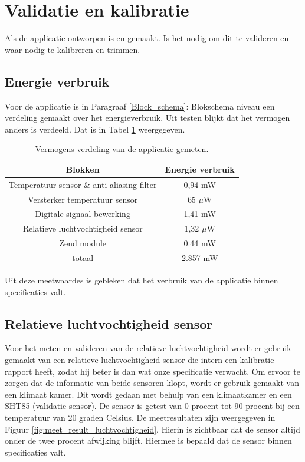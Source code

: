 \section{Validatie en kalibratie}
Als de applicatie ontworpen is en gemaakt. Is het nodig om dit te valideren en waar nodig te kalibreren en trimmen.
\subsection{Energie verbruik}
Voor de applicatie is in Paragraaf \ref{Block_schema}: Blokschema niveau een verdeling gemaakt over het energieverbruik. Uit testen blijkt dat het vermogen anders is verdeeld. Dat is in Tabel \ref{tab:Energie_verbruik_validatie} weergegeven.

\begin{table}[H]
    \centering
    \begin{tabular}{|c|c|}
        \hline
        \textbf{Blokken} & \textbf{Energie verbruik} \\ \hline
        Temperatuur sensor \& anti aliasing filter & 0,94 mW \\ \hline
        Versterker temperatuur sensor  & 65 $\mu$W \\ \hline
        Digitale signaal bewerking & 1,41 mW \\ \hline
        Relatieve luchtvochtigheid sensor & 1,32 $\mu$W \\ \hline
        Zend module & 0.44 mW \\ \hline
        totaal  & 2.857 mW \\ \hline
    \end{tabular}
    \caption{Vermogens verdeling van de applicatie gemeten.}
    \label{tab:Energie_verbruik_validatie}
\end{table}
Uit deze meetwaardes is gebleken dat het verbruik van de applicatie binnen specificaties valt.

\subsection{Relatieve luchtvochtigheid sensor}
Voor het meten en valideren van de relatieve luchtvochtigheid wordt er gebruik gemaakt van een relatieve luchtvochtigheid sensor die intern een kalibratie rapport heeft, zodat hij beter is dan wat onze specificatie verwacht. Om ervoor te zorgen dat de informatie van beide sensoren klopt, wordt er gebruik gemaakt van een klimaat kamer. Dit wordt gedaan met behulp van een klimaatkamer en een SHT85 (validatie sensor). De sensor is getest van 0 procent tot 90 procent bij een temperatuur van 20 graden Celsius. De meetresultaten zijn weergegeven in Figuur \ref{fig:meet_result_luchtvochtigheid}. Hierin is zichtbaar dat de sensor altijd onder de twee procent afwijking blijft. Hiermee is bepaald dat de sensor binnen specificaties valt.

